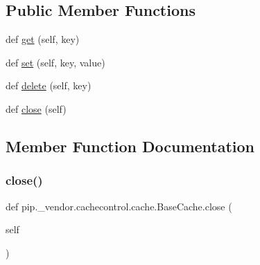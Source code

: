 \subsection*{Public Member Functions}
\begin{DoxyCompactItemize}
\item 
def \hyperlink{classpip_1_1__vendor_1_1cachecontrol_1_1cache_1_1BaseCache_ad5c273adabffacc22029a8461bdcb8e0}{get} (self, key)
\item 
def \hyperlink{classpip_1_1__vendor_1_1cachecontrol_1_1cache_1_1BaseCache_aa36247ddf4e818de3a025bcc3170145c}{set} (self, key, value)
\item 
def \hyperlink{classpip_1_1__vendor_1_1cachecontrol_1_1cache_1_1BaseCache_a78a73165a30b294597fd6a634d41daef}{delete} (self, key)
\item 
def \hyperlink{classpip_1_1__vendor_1_1cachecontrol_1_1cache_1_1BaseCache_a8017769efeea6eff571e348aa704688e}{close} (self)
\end{DoxyCompactItemize}


\subsection{Member Function Documentation}
\mbox{\label{classpip_1_1__vendor_1_1cachecontrol_1_1cache_1_1BaseCache_a8017769efeea6eff571e348aa704688e}} 
\subsubsection{\texorpdfstring{close()}{close()}}
{\footnotesize\ttfamily def pip.\+\_\+vendor.\+cachecontrol.\+cache.\+Base\+Cache.\+close (\begin{DoxyParamCaption}\item[{}]{self }\end{DoxyParamCaption})}

\mbox{\label{classpip_1_1__vendor_1_1cachecontrol_1_1cache_1_1BaseCache_a78a73165a30b294597fd6a634d41daef}} 
